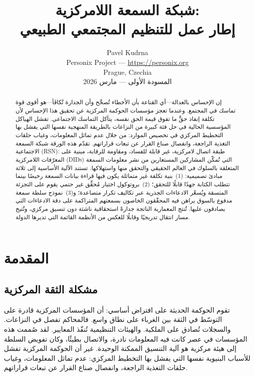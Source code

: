 \documentclass[11pt,a4paper,twocolumn]{article}
\title{\textbf{شبكة السمعة اللامركزية:\\إطار عمل للتنظيم المجتمعي الطبيعي}}
\author{Pavel Kudrna\\Personix Project --- \url{https://personix.org}\\Prague, Czechia\\المسودة الأولى --- مارس 2026}
\date{}
\begin{document}
\maketitle

\begin{abstract}
إن الإحساس بالعدالة---أي القناعة بأن الأخطاء تُصحَّح وأن الجدارة تُكافَأ---هو أقوى قوة تماسك في المجتمع. وعندما تعجز مؤسسات الحوكمة المركزية عن تحقيق هذا الإحساس لأن تكلفة إنفاذ حقٍّ ما تفوق قيمة الحق نفسه، يتآكل التماسك الاجتماعي. تفشل الهياكل المؤسسية الحالية في حل فئة كبيرة من النزاعات بالطريقة المنهجية نفسها التي يفشل بها التخطيط المركزي في تخصيص الموارد: من خلال عدم تماثل المعلومات، وغياب حلقات التغذية الراجعة، وانفصال صناع القرار عن تبعات قراراتهم. تقدّم هذه الورقة شبكة السمعة الاجتماعية (RSN): طبقة اتصال لامركزية، غير قابلة للفساد، ومقاومة للرقابة، مبنية على المعرّفات اللامركزية (DIDs) التي تُمكّن المشاركين المستعارين من نشر معلومات السمعة المتعلقة بالسلوك في العالم الحقيقي والتحقق منها واستهلاكها. تستند الآلية الأساسية إلى ثلاثة مبادئ تصميمية: (1)~بنية تكلفة غير متماثلة يكون فيها قراءة بيانات السمعة رخيصًا بينما تتطلب الكتابة جهدًا قابلًا للتحقق؛ (2)~بروتوكول اختيار مُحقِّق غير حتمي يقوم على التجزئة المتسقة ويُسعّر الادعاءات الجذرية عبر تكاليف تكرار متصاعدة؛ و(3)~نموذج سلطة سمعة مدفوع بالسوق يراهن فيه المحقّقون الخاصون بسمعتهم المتراكمة على دقة الادعاءات التي يصادقون عليها. تُنتج المعمارية الناتجة جدارةً استحقاقية ناشئة دون تنسيق مركزي، وتُتيح مسار انتقال تدريجيًا وقابلًا للعكس من الأنظمة القائمة التي تديرها الدولة.
\end{abstract}

\section{المقدمة}

\subsection{مشكلة الثقة المركزية}

تقوم الحوكمة الحديثة على افتراض أساسي: أن المؤسسات المركزية قادرة على التوسّط في الثقة بين الغرباء على نطاق واسع. فالمحاكم تفصل في النزاعات. والسجلات تُصادق على الملكية. والهيئات التنظيمية تُنفّذ المعايير. لقد صُممت هذه المؤسسات في عصر كانت فيه المعلومات نادرة، والاتصال بطيئًا، وكان تفويض السلطة إلى هيئة مركزية هو آلية التنسيق الممكنة الوحيدة. غير أن الحوكمة المركزية تفشل للأسباب البنيوية نفسها التي يفشل بها التخطيط المركزي: عدم تماثل المعلومات، وغياب حلقات التغذية الراجعة، وانفصال صناع القرار عن تبعات قراراتهم.
\end{document}
